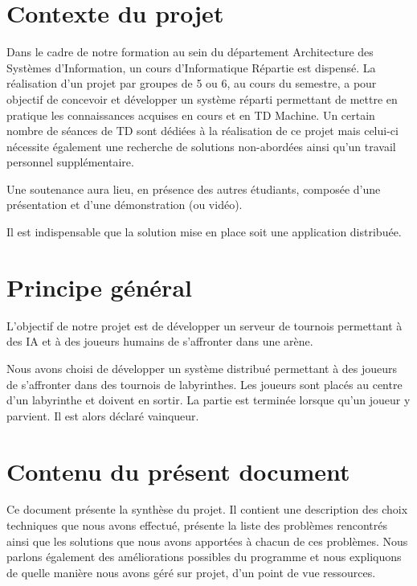 \section*{Contexte du projet}
    Dans le cadre de notre formation au sein du département Architecture des Systèmes d'Information, un cours d'Informatique Répartie est dispensé. La réalisation d'un projet par groupes de 5 ou 6, au cours du semestre, a pour objectif de concevoir et développer un système réparti permettant de mettre en pratique les connaissances acquises en cours et en TD Machine. Un certain nombre de séances de TD sont dédiées à la réalisation de ce projet mais celui-ci nécessite également une recherche de solutions non-abordées ainsi qu'un travail personnel supplémentaire.

    Une soutenance aura lieu, en présence des autres étudiants, composée d'une présentation et d'une démonstration (ou vidéo).

    Il est indispensable que la solution mise en place soit une application distribuée. %


\section*{Principe général}
    L'objectif de notre projet est de développer un serveur de tournois permettant à des IA et à des joueurs humains de s'affronter dans une arène.

    Nous avons choisi de développer un système distribué permettant à des joueurs de s'affronter dans des tournois de labyrinthes. Les joueurs sont placés au centre d'un labyrinthe et doivent en sortir. La partie est terminée lorsque qu'un joueur y parvient. Il est alors déclaré vainqueur.


\section*{Contenu du présent document}
	Ce document présente la synthèse du projet. Il contient une description des choix techniques que nous avons effectué, présente la liste des problèmes rencontrés ainsi que les solutions que nous avons apportées à chacun de ces problèmes. Nous parlons également des améliorations possibles du programme et nous expliquons de quelle manière nous avons géré sur projet, d'un point de vue ressources.
